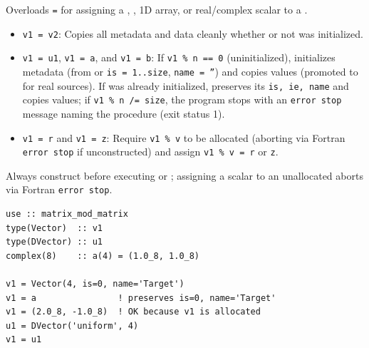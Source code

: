 Overloads \texttt{=} for assigning a , , 1D  array, or real/complex scalar to a .

\begin{itemize}
  \item \texttt{v1 = v2}: Copies all metadata and data cleanly whether or not  was initialized.
  \item \texttt{v1 = u1}, \texttt{v1 = a}, and \texttt{v1 = b}: If \texttt{v1 \% n == 0} (uninitialized), initializes metadata (from  or \texttt{is = 1..size}, \texttt{name = ''}) and copies values (promoted to  for real sources). If  was already initialized, preserves its \texttt{is, ie, name} and copies values; if \texttt{v1 \% n /= size}, the program stops with an \texttt{error stop} message naming the procedure (exit status 1).
  \item \texttt{v1 = r} and \texttt{v1 = z}: Require \texttt{v1 \% v} to be allocated (aborting via Fortran \texttt{error stop} if unconstructed) and assign \texttt{v1 \% v = r} or \texttt{z}.
\end{itemize}

\begin{notebox}
Always construct  before executing  or ; assigning a scalar to an unallocated  aborts via Fortran \texttt{error stop}.
\end{notebox}

\begin{description}[leftmargin=2.2cm, style=nextline]
\end{description}

\lstset{language=[95]Fortran}
\begin{lstlisting}
use :: matrix_mod_matrix
type(Vector)  :: v1
type(DVector) :: u1
complex(8)    :: a(4) = (1.0_8, 1.0_8)

v1 = Vector(4, is=0, name='Target')
v1 = a                ! preserves is=0, name='Target'
v1 = (2.0_8, -1.0_8)  ! OK because v1 is allocated
u1 = DVector('uniform', 4)
v1 = u1
\end{lstlisting}

